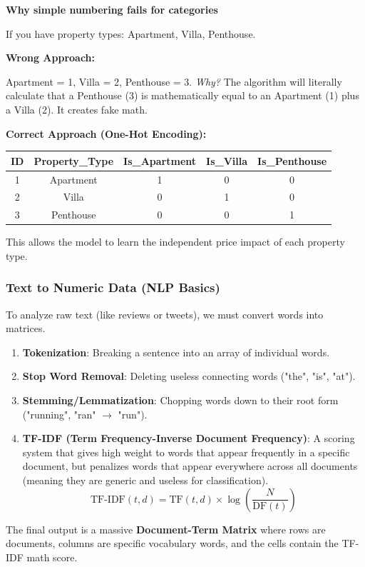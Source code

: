 \begin{example}{\textbf{Why simple numbering fails for categories}}

If you have property types: Apartment, Villa, Penthouse. 

\textbf{Wrong Approach:} 

Apartment = 1, Villa = 2, Penthouse = 3. 
\textit{Why?} The algorithm will literally calculate that a Penthouse (3) is mathematically equal to an Apartment (1) plus a Villa (2). It creates fake math.

\pagebreak
\textbf{Correct Approach (One-Hot Encoding):}
\vs

\begin{center}
\begin{tabular}{|c|c|c|c|c|}
\hline
\textbf{ID} & \textbf{Property\_Type} & \textbf{Is\_Apartment} & \textbf{Is\_Villa} & \textbf{Is\_Penthouse} \\
\hline
1 & Apartment & 1 & 0 & 0 \\
2 & Villa & 0 & 1 & 0 \\
3 & Penthouse & 0 & 0 & 1 \\
\hline
\end{tabular}
\end{center}

\vs
This allows the model to learn the independent price impact of each property type.
\end{example}

\subsubsection{Text to Numeric Data (NLP Basics)}

To analyze raw text (like reviews or tweets), we must convert words into matrices. 

\begin{enumerate}
    \item \textbf{Tokenization}: Breaking a sentence into an array of individual words.
    \item \textbf{Stop Word Removal}: Deleting useless connecting words ("the", "is", "at").
    \item \textbf{Stemming/Lemmatization}: Chopping words down to their root form ("running", "ran" $\rightarrow$ "run").
    \item \textbf{TF-IDF (Term Frequency-Inverse Document Frequency)}: A scoring system that gives high weight to words that appear frequently in a specific document, but penalizes words that appear everywhere across all documents (meaning they are generic and useless for classification).
    \begin{equation}
        \text{TF-IDF}(t,d) = \text{TF}(t,d) \times \log\left(\frac{N}{\text{DF}(t)}\right)
    \end{equation}
\end{enumerate}
The final output is a massive \textbf{Document-Term Matrix} where rows are documents, columns are specific vocabulary words, and the cells contain the TF-IDF math score.

